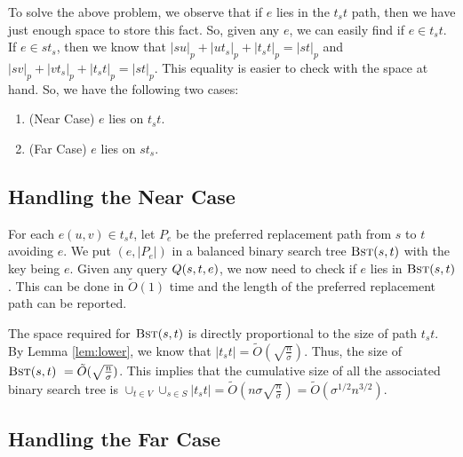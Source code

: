 To solve the above problem, we observe that if $e$ lies in the  $t_st$ path, then we have just enough space to store this fact. So, given any $e$, we can easily find if $e \in t_st$. If $e \in st_s$, then we know that $|su|_p+|ut_s|_p+|t_st|_p = |st|_p$ and $|sv|_p+|vt_s|_p+|t_st|_p
= |st|_p$. This equality is easier to check with the space at hand. So, we have the following two cases:



\begin{enumerate}
\item(Near Case) $e$ lies on $t_st$.
\item(Far Case) $e$ lies on $st_s$.
\end{enumerate}

\iflong
\else
\vspace{-2mm}
\fi
\subsection{Handling the Near Case}

For each $e(u,v) \in t_st$, let $P_e$ be the preferred replacement path from $s$ to $t$ avoiding $e$. We put $(e, |P_e|)$ in a balanced binary search tree $\textsc{Bst}(s,t)$ with the key being $e$.  Given any query $\sc{Q}(s,t,e)$, we now need to check if $e$ lies in $\textsc{Bst}(s,t)$. This can be done in $\tilde O(1)$ time and the length of the preferred replacement path  can be reported.

The space required for $\textsc{Bst}(s,t)$ is directly proportional to the size of path $t_st$. By Lemma \ref{lem:lower}, we know that $|t_st| = \tilde O(\sqrt{\frac{n}{\sigma}})$. Thus, the size of $\textsc{Bst}(s,t)\ = \tilde O(\sqrt{\frac{n}{\sigma}})$. This implies that the cumulative size of all the associated binary search tree  is $\cup_{t \in V}\cup_{s \in S} |t_st| = \tilde O( n \sigma \sqrt{\frac{n}{\sigma}}) = \tilde O(\sigma^{1/2} n^{3/2})$.
\iflong
\else
\vspace{-3mm}
\fi
\subsection{Handling the Far Case}

